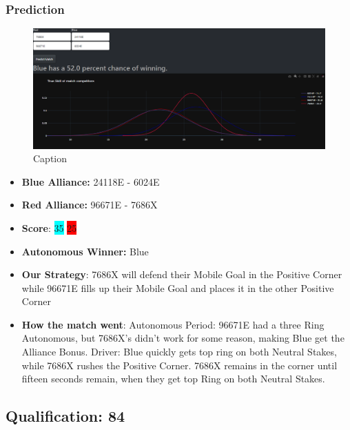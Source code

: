 \subsubsection*{Prediction}
\begin{figure}[H]
    \centering
    \includegraphics[width=0.8\linewidth]{images/Q78ND.png}
    \caption{Caption}
    \label{fig:enter-label}
\end{figure}
\begin{itemize}
    \item \textbf{Blue Alliance:} 24118E - 6024E
    \item \textbf{Red Alliance:} 96671E - 7686X
    \item \textbf{Score}: \colorbox{cyan}{35}
    \colorbox{red}{25}
    \item \textbf{Autonomous Winner:} Blue
    \item \textbf{Our Strategy}: 7686X will defend their Mobile Goal in the Positive Corner while 96671E fills up their Mobile Goal and places it in the other Positive Corner
    \item \textbf{How the match went}: Autonomous Period: 96671E had a three Ring Autonomous, but 7686X's didn't work for some reason, making Blue get the Alliance Bonus. Driver: Blue quickly gets top ring on both Neutral Stakes, while 7686X rushes the Positive Corner. 7686X remains in the corner until fifteen seconds remain, when they get top Ring on both Neutral Stakes.
\end{itemize}

\subsection*{Qualification: 84}
